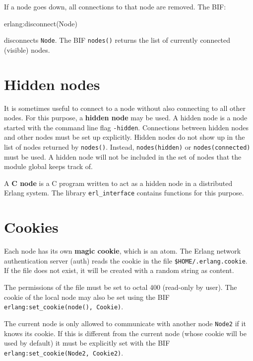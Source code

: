 If a node goes down, all connections to that node are removed. The
BIF:

\begin{erlang}
erlang:disconnect(Node)
\end{erlang}

disconnects \texttt{Node}. The BIF \texttt{nodes()} returns the list of
currently connected (visible) nodes.


\section{Hidden nodes}
It is sometimes useful to connect to a node without also connecting to
all other nodes. For this purpose, a \textbf{hidden node} may be
used. A hidden node is a node started with the command line flag
\texttt{-hidden}.  Connections between hidden nodes and other nodes must be set
up explicitly. Hidden nodes do not show up in the list of nodes
returned by \texttt{nodes()}. Instead, \texttt{nodes(hidden)} or \texttt{nodes(connected)} must
be used. A hidden node will not be included in the set of nodes that
the module global keeps track of.

A \textbf{C node} is a C program written to act as a hidden node in a
distributed Erlang system. The library \texttt{erl\_interface}
contains functions for this purpose.


\section{Cookies}
Each node has its own \textbf{magic cookie}, which is an atom. The
Erlang network authentication server (auth) reads the cookie in the
file \texttt{\$HOME/.erlang.cookie}. If the file does not exist, it
will be created with a random string as content.


The permissions of the file must be set to octal 400 (read-only
by user).  The cookie of the local node may also be set using the BIF
\texttt{erlang:set\_cookie(node(), Cookie)}.

The current node is only allowed to communicate with another node
\texttt{Node2} if it knows its cookie.  If this is different from the current node (whose cookie will
be used by default) it must be explicitly set with the BIF \texttt{erlang:set\_cookie(Node2, Cookie2)}.



